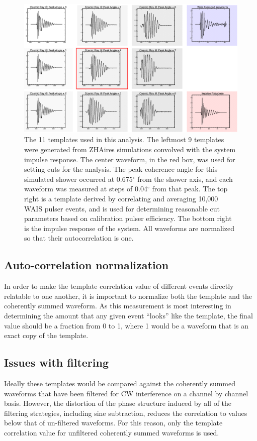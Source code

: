 \begin{figure}
	\centering
	\includegraphics[width=\textwidth]{figures/templates}
	\caption{The 11 templates used in this analysis.  The leftmost 9 templates were generated from ZHAires simulations convolved with the system impulse response. The center waveform, in the red box, was used for setting cuts for the analysis.  The peak coherence angle for this simulated shower occurred at 0.675$^{\circ}$ from the shower axis, and each waveform was measured at steps of 0.04$^{\circ}$ from that peak.  The top right is a template derived by correlating and averaging 10,000 WAIS pulser events, and is used for determining reasonable cut parameters based on calibration pulser efficiency.  The bottom right is the impulse response of the system.  All waveforms are normalized so that their autocorrelation is one.} 
	\label{fig:templates}
\end{figure}		
		
		
	
	\subsection{Auto-correlation normalization}
		In order to make the template correlation value of different events directly relatable to one another, it is important to normalize both the template and the coherently summed waveform.  As this measurement is most interesting in determining the amount that any given event ``looks'' like the template, the final value should be a fraction from 0 to 1, where 1 would be a waveform that is an exact copy of the template.

	\subsection{Issues with filtering}
		Ideally these templates would be compared against the coherently summed waveforms that have been filtered for CW interference on a channel by channel basis.  However, the distortion of the phase structure induced by all of the filtering strategies, including sine subtraction, reduces the correlation to values below that of un-filtered waveforms.  For this reason, only the template correlation value for unfiltered coherently summed waveforms is used.

